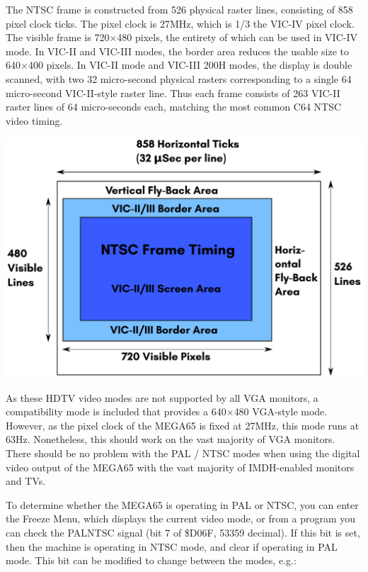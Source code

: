 The NTSC frame is constructed from 526 physical raster lines, consisting of 858 pixel clock ticks. The pixel clock is 27MHz, which is 1/3 the VIC-IV pixel clock.  The visible frame is 720$\times$480 pixels, the entirety of which can be used in VIC-IV mode. In VIC-II and VIC-III modes, the border area reduces the usable size to 640$\times$400 pixels.  In VIC-II mode and VIC-III 200H modes, the display is double scanned, with two 32 micro-second physical rasters corresponding to a single 64 micro-second VIC-II-style raster line.  Thus each frame consists of 263 VIC-II raster lines of 64 micro-seconds each, matching the most common C64 NTSC video timing.

\includegraphics[width=\linewidth]{images/illustrations/VIC-IV-NTSC-Frame.pdf}

As these HDTV video modes are not supported by all VGA monitors, a compatibility mode is included that provides a 640$\times$480 VGA-style mode. However, as the pixel clock of the MEGA65 is fixed at 27MHz, this mode runs at 63Hz.  Nonetheless, this should work on the vast majority of VGA monitors.  There should be no problem with the PAL / NTSC modes when using the digital video output of the MEGA65 with the vast majority of IMDH\texttrademark-enabled monitors and TVs.

To determine whether the MEGA65 is operating in PAL or NTSC, you can enter the Freeze Menu, which displays the current video mode, or from a program you can check the PALNTSC signal (bit 7 of \$D06F, 53359 decimal). If this bit is set, then the machine is operating in NTSC mode, and clear if operating in PAL mode. This bit can be modified to change between the modes, e.g.:

